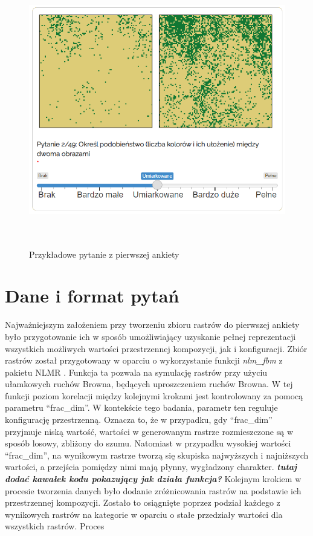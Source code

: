 \documentclass{amuthesis}
\begin{document}
\begin{figure}[t]

{\centering \includegraphics[width=1\textwidth,height=4.6875in]{figures/przyklad_pytania.png}

}

\caption{\label{fig-przyklad_pytania}Przykładowe pytanie z pierwszej
ankiety}

\end{figure}

\hypertarget{dane-i-format-pytaux144}{%
\section{Dane i format pytań}\label{dane-i-format-pytaux144}}

Najważniejszym założeniem przy tworzeniu zbioru rastrów do pierwszej
ankiety było przygotowanie ich w sposób umożliwiający uzyskanie pełnej
reprezentacji wszystkich możliwych wartości przestrzennej kompozycji,
jak i konfiguracji. Zbiór rastrów został przygotowany w oparciu o
wykorzystanie funkcji \emph{nlm\_fbm} z pakietu NLMR
\autocite{NLMR2018}. Funkcja ta pozwala na symulację rastrów przy użyciu
ułamkowych ruchów Browna, będących uproszczeniem ruchów Browna. W tej
funkcji poziom korelacji między kolejnymi krokami jest kontrolowany za
pomocą parametru ``frac\_dim''. W kontekście tego badania, parametr ten
reguluje konfigurację przestrzenną. Oznacza to, że w przypadku, gdy
``frac\_dim'' przyjmuje niską wartość, wartości w generowanym rastrze
rozmieszczone są w sposób losowy, zbliżony do szumu. Natomiast w
przypadku wysokiej wartości ``frac\_dim'', na wynikowym rastrze tworzą
się skupiska najwyższych i najniższych wartości, a przejścia pomiędzy
nimi mają płynny, wygładzony charakter. \textbf{\emph{tutaj dodać
kawałek kodu pokazujący jak działa funkcja?}} Kolejnym krokiem w
procesie tworzenia danych było dodanie zróżnicowania rastrów na
podstawie ich przestrzennej kompozycji. Zostało to osiągnięte poprzez
podział każdego z wynikowych rastrów na kategorie w oparciu o stałe
przedziały wartości dla wszystkich rastrów. Proces
\end{document}
